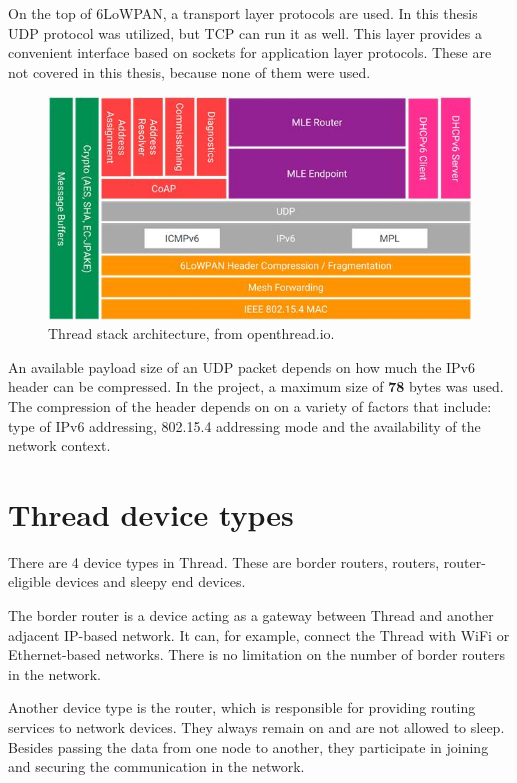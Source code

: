 On the top of 6LoWPAN, a transport layer protocols are used. In this thesis UDP protocol was utilized, but
TCP can run it as well. This layer provides a convenient interface based on sockets for 
application layer protocols. These are not covered in this thesis, because none
of them were used.

\begin{figure}[H]
    \centering
    \includegraphics[scale=0.8]{images/ot_architecture.jpg}
    \caption{Thread stack architecture, from openthread.io.}
    \label{fig:thread_stack}
\end{figure}

An available payload size of an UDP packet depends on how much the IPv6 header can be compressed. 
In the project, a maximum size of \textbf{78} bytes was used. The compression of the header depends on
on a variety of factors that include: type of IPv6 addressing, 802.15.4 addressing mode and the availability of the network context\cite{ThreadUsageOf6LoWPAN}.

\section{Thread device types}

There are 4 device types in Thread\cite{ThreadStackFundamentals}. These are border routers, routers, 
router-eligible devices and sleepy end devices.

The border router is a device acting as a gateway between Thread and another adjacent IP-based network. It can, for
example, connect the Thread with WiFi or Ethernet-based networks. There is no limitation on the number of border
routers in the network.

Another device type is the router, which is responsible for providing routing services to network devices. They always 
remain on and are not allowed to sleep. Besides passing the data from one node to another, they participate
in joining and securing the communication in the network\cite{ThreadFundamentals}. 

